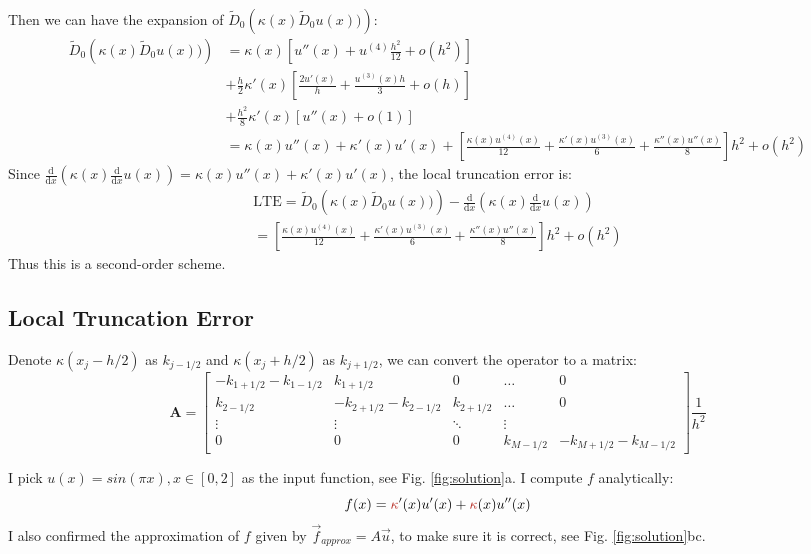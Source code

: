 \documentclass[12pt, fullpage,letterpaper]{article}
\newcommand{\mathd}{\textrm{d}}
\newcommand{\ddx}[1]{\frac{\mathd}{\mathd #1}}
\newcommand{\an}[1]{{\leavevmode\color{BrickRed}{#1}}}
\begin{document}
Then we can have the expansion of $\widetilde{D}_0 \left( \kappa(x) \widetilde{D}_0 u(x))\right)$:
\begin{equation}
\begin{split}
\widetilde{D}_0 \left( \kappa(x) \widetilde{D}_0 u(x))\right) &= \kappa(x)\left[ u''(x)+u^{(4)}\frac{h^2}{12} +o(h^2) \right]\\
&+\frac{h}{2}\kappa'(x) \left[\frac{2u'(x)}{h} + \frac{u^{(3)}(x)h}{3} + o(h)\right]\\
&+\frac{h^2}{8}\kappa'(x) \left[u''(x) + o(1)\right]\\
&= \kappa(x)u''(x) + \kappa'(x)u'(x) + \left[ \frac{\kappa(x)u^{(4)}(x)}{12} + \frac{\kappa'(x)u^{(3)}(x)}{6} + \frac{\kappa''(x)u''(x)}{8}\right]h^2 +o(h^2)
\end{split}
\end{equation}
Since $\ddx{x} \left(\kappa(x) \ddx{x} u(x) \right) = \kappa(x)u''(x) + \kappa'(x)u'(x)$, the local truncation error is:
\begin{equation}
\begin{split}
\text{LTE} = \widetilde{D}_0 \left( \kappa(x) \widetilde{D}_0 u(x))\right) - \ddx{x} \left(\kappa(x) \ddx{x} u(x) \right) \\
=  \left[ \frac{\kappa(x)u^{(4)}(x)}{12} + \frac{\kappa'(x)u^{(3)}(x)}{6} + \frac{\kappa''(x)u''(x)}{8}\right]h^2 +o(h^2)
\end{split}
\end{equation}
Thus this is a second-order scheme.

\subsection{Local Truncation Error}
\an{Did you mean to title this section something different?}
Denote $\kappa(x_j-h/2)$ as $k_{j-1/2}$ and  $\kappa(x_j+h/2)$ as $k_{j+1/2}$, we can convert the operator to a matrix:
\begin{equation}
\mathbf{A}=
\begin{bmatrix}
-k_{1+1/2}-k_{1-1/2} & k_{1+1/2} &0 & \hdots & 0 \\
k_{2-1/2} & - k_{2+1/2}-k_{2-1/2} & k_{2+1/2} &\hdots & 0 \\
\vdots &  \vdots  & \ddots & \vdots \\
0 & 0 & 0 & k_{M-1/2} & -k_{M+1/2}-k_{M-1/2} 
\end{bmatrix}  \frac{1}{h^2}
\end{equation}

I pick $u(x)=sin(\pi x), x \in [0,2]$ as the input function, see Fig. \ref{fig:solution}a.
I compute $f$ analytically:
\begin{equation}
  f(x) = \an{\kappa}'(x)u'(x) + \an{\kappa}(x)u''(x)
\end{equation}
I also confirmed the approximation of $f$ given by $\vec{f}_{approx} = A \vec{u}$, to make sure it is correct, see  Fig. \ref{fig:solution}bc.
\end{document}
